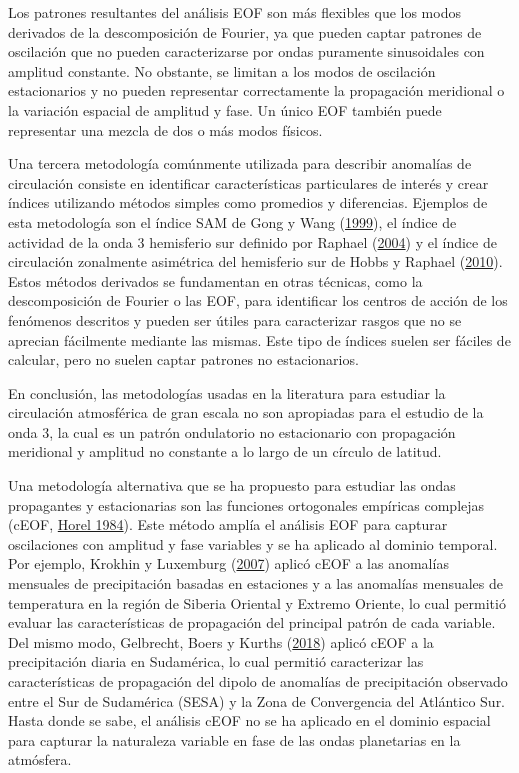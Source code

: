 \documentclass[12pt,oneside,a4paper]{reedthesis}
\begin{document}
Los patrones resultantes del análisis EOF son más flexibles que los modos derivados de la descomposición de Fourier, ya que pueden captar patrones de oscilación que no pueden caracterizarse por ondas puramente sinusoidales con amplitud constante.
No obstante, se limitan a los modos de oscilación estacionarios y no pueden representar correctamente la propagación meridional o la variación espacial de amplitud y fase.
Un único EOF también puede representar una mezcla de dos o más modos físicos.

Una tercera metodología comúnmente utilizada para describir anomalías de circulación consiste en identificar características particulares de interés y crear índices utilizando métodos simples como promedios y diferencias.
Ejemplos de esta metodología son el índice SAM de Gong y Wang (\protect\hyperlink{ref-gong1999}{1999}), el índice de actividad de la onda 3 hemisferio sur definido por Raphael (\protect\hyperlink{ref-raphael2004}{2004}) y el índice de circulación zonalmente asimétrica del hemisferio sur de Hobbs y Raphael (\protect\hyperlink{ref-hobbs2010}{2010}).
Estos métodos derivados se fundamentan en otras técnicas, como la descomposición de Fourier o las EOF, para identificar los centros de acción de los fenómenos descritos y pueden ser útiles para caracterizar rasgos que no se aprecian fácilmente mediante las mismas.
Este tipo de índices suelen ser fáciles de calcular, pero no suelen captar patrones no estacionarios.

En conclusión, las metodologías usadas en la literatura para estudiar la circulación atmosférica de gran escala no son apropiadas para el estudio de la onda 3, la cual es un patrón ondulatorio no estacionario con propagación meridional y amplitud no constante a lo largo de un círculo de latitud.

Una metodología alternativa que se ha propuesto para estudiar las ondas propagantes y estacionarias son las funciones ortogonales empíricas complejas (cEOF, \protect\hyperlink{ref-horel1984}{Horel 1984}).
Este método amplía el análisis EOF para capturar oscilaciones con amplitud y fase variables y se ha aplicado al dominio temporal.
Por ejemplo, Krokhin y Luxemburg (\protect\hyperlink{ref-krokhin2007}{2007}) aplicó cEOF a las anomalías mensuales de precipitación basadas en estaciones y a las anomalías mensuales de temperatura en la región de Siberia Oriental y Extremo Oriente, lo cual permitió evaluar las características de propagación del principal patrón de cada variable.
Del mismo modo, Gelbrecht, Boers y Kurths (\protect\hyperlink{ref-gelbrecht2018}{2018}) aplicó cEOF a la precipitación diaria en Sudamérica, lo cual permitió caracterizar las características de propagación del dipolo de anomalías de precipitación observado entre el Sur de Sudamérica (SESA) y la Zona de Convergencia del Atlántico Sur.
Hasta donde se sabe, el análisis cEOF no se ha aplicado en el dominio espacial para capturar la naturaleza variable en fase de las ondas planetarias en la atmósfera.
\end{document}
